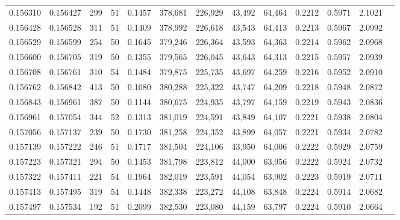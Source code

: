 \begin{tabular}{rrrrrrrrrrrrr}
0.156310 & 0.156427 &   299 &  51 &                                     0.1457 & 378,681 & 226,929 &  43,492 &  64,464 & 0.2212 & 0.5971 & 2.1021 \\
0.156428 & 0.156528 &   311 &  51 &                                     0.1409 & 378,992 & 226,618 &  43,543 &  64,413 & 0.2213 & 0.5967 & 2.0992 \\
0.156529 & 0.156599 &   254 &  50 &                                     0.1645 & 379,246 & 226,364 &  43,593 &  64,363 & 0.2214 & 0.5962 & 2.0968 \\
0.156600 & 0.156705 &   319 &  50 &                                     0.1355 & 379,565 & 226,045 &  43,643 &  64,313 & 0.2215 & 0.5957 & 2.0939 \\
0.156708 & 0.156761 &   310 &  54 &                                     0.1484 & 379,875 & 225,735 &  43,697 &  64,259 & 0.2216 & 0.5952 & 2.0910 \\
0.156762 & 0.156842 &   413 &  50 &                                     0.1080 & 380,288 & 225,322 &  43,747 &  64,209 & 0.2218 & 0.5948 & 2.0872 \\
0.156843 & 0.156961 &   387 &  50 &                                     0.1144 & 380,675 & 224,935 &  43,797 &  64,159 & 0.2219 & 0.5943 & 2.0836 \\
0.156961 & 0.157054 &   344 &  52 &                                     0.1313 & 381,019 & 224,591 &  43,849 &  64,107 & 0.2221 & 0.5938 & 2.0804 \\
0.157056 & 0.157137 &   239 &  50 &                                     0.1730 & 381,258 & 224,352 &  43,899 &  64,057 & 0.2221 & 0.5934 & 2.0782 \\
0.157139 & 0.157222 &   246 &  51 &                                     0.1717 & 381,504 & 224,106 &  43,950 &  64,006 & 0.2222 & 0.5929 & 2.0759 \\
0.157223 & 0.157321 &   294 &  50 &                                     0.1453 & 381,798 & 223,812 &  44,000 &  63,956 & 0.2222 & 0.5924 & 2.0732 \\
0.157322 & 0.157411 &   221 &  54 &                                     0.1964 & 382,019 & 223,591 &  44,054 &  63,902 & 0.2223 & 0.5919 & 2.0711 \\
0.157413 & 0.157495 &   319 &  54 &                                     0.1448 & 382,338 & 223,272 &  44,108 &  63,848 & 0.2224 & 0.5914 & 2.0682 \\
0.157497 & 0.157534 &   192 &  51 &                                     0.2099 & 382,530 & 223,080 &  44,159 &  63,797 & 0.2224 & 0.5910 & 2.0664 \\

\end{tabular}
